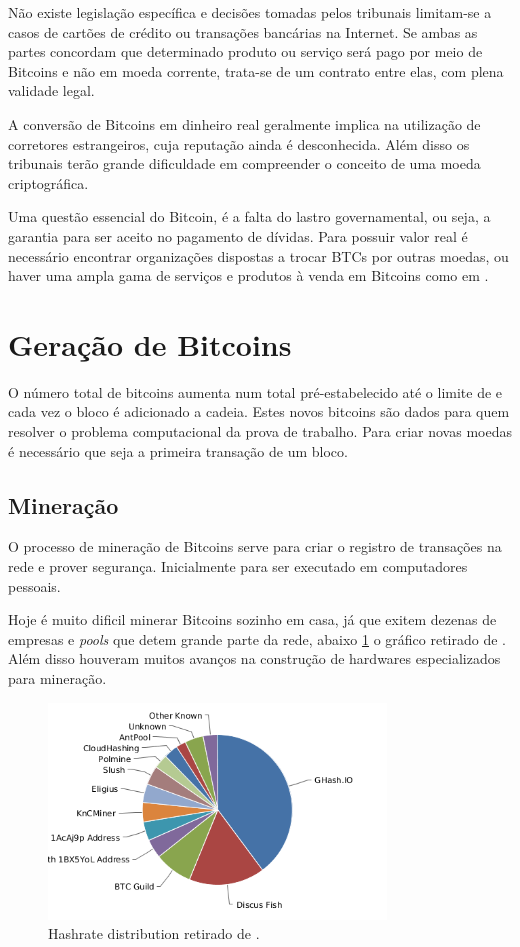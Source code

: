 \documentclass[a4paper,11pt]{article}
\theoremstyle{mytheor}
\begin{document}
Não existe legislação específica e decisões tomadas pelos tribunais limitam-se a casos de cartões de crédito ou transações bancárias na Internet. Se ambas as partes concordam que determinado produto ou serviço será pago por meio de Bitcoins e não em moeda corrente, trata-se de um contrato entre elas, com plena validade legal.

A conversão de Bitcoins em dinheiro real geralmente implica na utilização de corretores estrangeiros, cuja reputação ainda é desconhecida. Além disso os tribunais terão grande dificuldade em compreender o conceito de uma moeda criptográfica.

Uma questão essencial do Bitcoin, é a falta do lastro governamental, ou seja, a garantia para ser aceito no pagamento de dívidas. Para possuir valor real é necessário encontrar organizações dispostas a trocar BTCs por outras moedas, ou haver uma ampla gama de serviços e produtos à venda em Bitcoins como em \cite{trade}.

\section*{Geração de Bitcoins}
O número total de bitcoins aumenta num total pré-estabelecido até o limite de e cada vez o bloco é adicionado a cadeia. Estes novos bitcoins são dados para quem resolver o problema computacional da prova de trabalho. Para criar novas moedas é necessário que seja a primeira transação de um bloco.
\subsection*{Mineração}
O processo de mineração de Bitcoins serve para criar o registro de transações na rede e prover segurança. Inicialmente para ser executado em computadores pessoais.

Hoje é muito dificil minerar Bitcoins sozinho em casa, já que exitem dezenas de empresas e \textit{pools} que detem grande parte da rede, abaixo \ref{pools} o gráfico retirado de \cite{pools}. Além disso houveram muitos avanços na construção de hardwares especializados para mineração.

\begin{figure}[H]
   \label{pools}
   \centering
   \includegraphics[width=0.8\textwidth]{images/pools.png}
   \caption{Hashrate distribution retirado de \cite{pools}.}
\end{figure}
\end{document}
